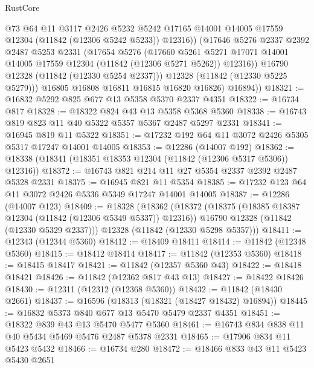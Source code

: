 \begin{lexlean}{RustCore}
\begin{coremodule}
                @73
                @64
                @11
                @3117
                @2426
                @5232
                @5242
                @17165
                @14001
                @14005
                @17559
                @12304
                (@11842 (@12306 @5242 @5233))
                @12316))
            (@17646
              @5276
              @2337
              @2392
              @2487
              @5253
              @2331
              (@17654
                @5276
                (@17660
                  @5261
                  @5271
                  @17071
                  @14001
                  @14005
                  @17559
                  @12304
                  (@11842 (@12306 @5271 @5262))
                  @12316))
              @16790
              @12328
              (@11842 (@12330 @5254 @2337)))
            @12328
            (@11842 (@12330 @5225 @5279)))
          @16805
          @16808
          @16811
          @16815
          @16820
          @16826)
        @16894))
@18321 := @16832 @5292 @825 @677 @13 @5358 @5370 @2337 @4351
@18322 := @16734 @817
@18328 := @18322 @824 @43 @13 @5358 @5368 @5360
@18338 := @16743 @819 @823 @11 @40 @5322 @5357 @5367 @2487 @5297 @2331
@18341 := @16945 @819 @11 @5322
@18351 := @17232 @192 @64 @11 @3072 @2426 @5305 @5317 @17247 @14001 @14005
@18353 := @12286 (@14007 @192)
@18362 := @18338 (@18341 (@18351 @18353 @12304 (@11842 (@12306 @5317 @5306)) @12316))
@18372 := @16743 @821 @214 @11 @27 @5354 @2337 @2392 @2487 @5328 @2331
@18375 := @16945 @821 @11 @5354
@18385 := @17232 @123 @64 @11 @3072 @2426 @5336 @5349 @17247 @14001 @14005
@18387 := @12286 (@14007 @123)
@18409 := @18328
    (@18362
      (@18372
        (@18375 (@18385 @18387 @12304 (@11842 (@12306 @5349 @5337)) @12316))
        @16790
        @12328
        (@11842 (@12330 @5329 @2337)))
      @12328
      (@11842 (@12330 @5298 @5357)))
@18411 := @12343 (@12344 @5360)
@18412 := @18409 @18411
@18414 := @11842 (@12348 @5360)
@18415 := @18412 @18414
@18417 := @11842 (@12353 @5360)
@18418 := @18415 @18417
@18421 := @11842 (@12357 @5360 @43)
@18422 := @18418 @18421
@18426 := @11842 (@12362 @817 @43 @13)
@18427 := @18422 @18426
@18430 := @12311 (@12312 (@12368 @5360))
@18432 := @11842 (@18430 @2661)
@18437 := @16596 (@18313 (@18321 (@18427 @18432) @16894))
@18445 := @16832 @5373 @840 @677 @13 @5470 @5479 @2337 @4351
@18451 := @18322 @839 @43 @13 @5470 @5477 @5360
@18461 := @16743 @834 @838 @11 @40 @5434 @5469 @5476 @2487 @5378 @2331
@18465 := @17906 @834 @11 @5423 @5432
@18466 := @16734 @280
@18472 := @18466 @833 @43 @11 @5423 @5430 @2651

\end{coremodule}
\end{lexlean}
